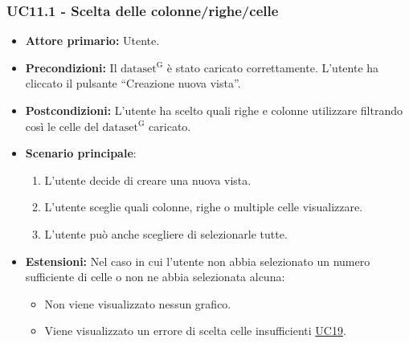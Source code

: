 \subsubsection{UC11.1 - Scelta delle colonne/righe/celle}
\label{sec:UC11.1}
\begin{itemize}
    \item \textbf{Attore primario:} Utente.
    \item \textbf{Precondizioni:} Il ${\mathrm{dataset^{G}}}$ è stato caricato correttamente. L'utente ha cliccato il pulsante ``Creazione nuova vista''.
    \item \textbf{Postcondizioni:} L'utente ha scelto quali righe e colonne utilizzare filtrando così le celle del ${\mathrm{dataset^{G}}}$ caricato.
    \item \textbf{Scenario principale}:
    \begin{enumerate}
		\item L'utente decide di creare una nuova vista.
		\item L'utente sceglie quali colonne, righe o multiple celle visualizzare.
		\item L'utente può anche scegliere di selezionarle tutte.
	\end{enumerate}
	\item \textbf{Estensioni:} Nel caso in cui l'utente non abbia selezionato un numero sufficiente di celle o non ne abbia selezionata alcuna:
              \begin{itemize}
                  \item Non viene visualizzato nessun grafico.
                  \item Viene visualizzato un errore di scelta celle insufficienti \hyperref[sec:UC19 - Errore-celle-insufficienti]{UC19}.
              \end{itemize}
\end{itemize}

\newpage


